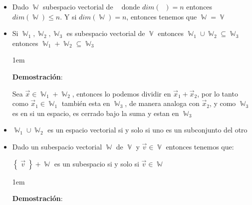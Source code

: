 \documentclass[12pt, fleqn]{report}                             %
\newenvironment{SmallIndentation}[1][0.75em]                    %
        {\begin{adjustwidth}{#1}{}\begin{footnotesize}}             %
        {\end{footnotesize}\end{adjustwidth}}                       %
\theoremstyle{break}                                            %
\DeclareMathOperator \GenericField {\mathbb{F}}                 %
\DeclareMathOperator \VectorSet    {\mathbb{V}}                 %
\DeclareMathOperator \SubVectorSet {\mathbb{W}}                 %
\DeclareMathOperator \VectorSpace  {\VectorSet_{\GenericField}} %
\newcommand{\Set}[1]            {\left\{ \; #1 \; \right\}}     %
\begin{document}
\begin{itemize}
                    \item
                        Dado $\SubVectorSet$ subespacio vectorial de $\VectorSpace$ donde $dim(\VectorSpace) = n$
                        entonces $dim(\SubVectorSet) \leq n$. Y si $dim(\SubVectorSet) = n$, entonces
                        tenemos que $\SubVectorSet = \VectorSet$ 
                            

                    \item
                        Si $\SubVectorSet_1, \SubVectorSet_2, \SubVectorSet_3$ es subespacio vectorial de $\VectorSet$
                        entonces $\SubVectorSet_1 \cup \SubVectorSet_2 \subseteq \SubVectorSet_3$ entonces
                        $\SubVectorSet_1 + \SubVectorSet_2 \subseteq \SubVectorSet_3$

                        \begin{SmallIndentation}[1em]
                            \textbf{Demostración}:
                            
                            Sea $\vec x \in \SubVectorSet_1 + \SubVectorSet_2$, entonces lo podemos dividir en
                            $\vec x_1 + \vec x_2$, por lo tanto como $\vec x_1 \in \SubVectorSet_1$ también esta
                            en $\SubVectorSet_3$, de manera analoga con $\vec x_2$, y como $\SubVectorSet_3$
                            es en si un espacio, es cerrado bajo la suma y estan en $\SubVectorSet_3$
                        \end{SmallIndentation}
                            

                    \item
                        $\SubVectorSet_1 \cup \SubVectorSet_2$ es un espacio vectorial si y solo si uno
                        es un subconjunto del otro

                    \item
                        Dado un subespacio vectorial $\SubVectorSet$ de $\VectorSet$ y $\vec v \in \VectorSet$
                        entonces tenemos que:

                        $\Set{\vec v} + \SubVectorSet$ es un subespacio si y solo si $\vec v \in \SubVectorSet$

                        \begin{SmallIndentation}[1em]
                            \textbf{Demostración}:
                            

\end{SmallIndentation}
\end{itemize}
\end{document}
